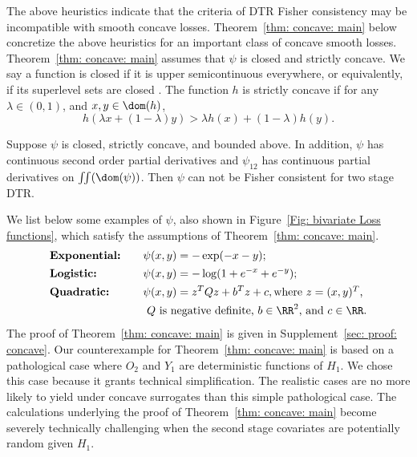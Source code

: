 \documentclass[preprint] {imsart}
\begin{document}
The above heuristics indicate  that the criteria of DTR Fisher consistency may be incompatible with  smooth concave losses. 
Theorem~\ref{thm: concave: main} below concretize the above heuristics for an important class of concave smooth losses.
Theorem~\ref{thm: concave: main} assumes that $\psi$ is closed and strictly concave. We say a  function is closed if it is upper semicontinuous everywhere, or equivalently, if its superlevel sets are closed \citep[pp. 78,][]{hiriart2004}. The function  
$h$ is strictly concave if for any $\lambda\in(0,1)$, and $x,y\in\dom(h)$,
 \[h(\lambda x+(1-\lambda)y)>\lambda h(x)+(1-\lambda)h(y).\]
 \begin{theorem}\label{thm: concave: main}
  Suppose  $\psi$ is closed, strictly concave, and bounded above. In addition, $\psi$ has continuous second order partial derivatives and $\psi_{12}$ has continuous partial derivatives on $\iint(\dom(\psi))$. 
   Then $\psi$ can not be Fisher consistent for two stage DTR.
  \end{theorem}
 We list below some examples of $\psi$, also shown in Figure~\ref{Fig: bivariate Loss functions}, which satisfy the assumptions of Theorem~\ref{thm: concave: main}. %
 \begin{alignat*}{2}
     & \mbox{\bf Exponential:} & \quad & \psi(x,y)=-\exp(-x-y); \\
     & \mbox{\bf Logistic:} & \quad & \psi(x,y)=-\log(1+e^{-x}+e^{-y}); \\
     & \mbox{\bf Quadratic:} & \quad & \psi(x,y)=z^TQz+b^Tz+c, \mbox{where $z=(x,y)^T$,}\\
     & & & \mbox{ $Q$ is negative definite, $b\in\RR^2$, and $c\in\RR$.}
 \end{alignat*}
  The proof of Theorem~\ref{thm: concave: main} is given in Supplement~\ref{sec: proof: concave}.  Our counterexample for Theorem~\ref{thm: concave: main} is  based on a pathological case where $O_2$ and $Y_1$ are deterministic functions of $H_1$. We chose this case %
  because it grants technical simplification. The  realistic cases are no more likely to yield under concave surrogates than this simple pathological case. The calculations underlying the proof of Theorem~\ref{thm: concave: main} become severely technically challenging when the second stage covariates are potentially random given $H_1$.
\end{document}

